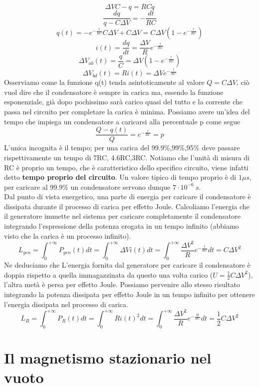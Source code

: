 \documentclass[
10pt, %
a4paper, %
oneside, %
headinclude,footinclude, %
BCOR5mm, %
]{scrartcl}
\begin{document}
\[\Delta V C-q = RC \dot{q}\]
\[\frac{dq}{q-C\Delta V}= -\frac{dt}{RC}\]
\[q(t) = -e^{-\frac{t}{RC}}C\Delta V+C\Delta V = C\Delta V(1-e^{-\frac{t}{RC}})\]
\[i(t) = \frac{dq}{dt} = \frac{\Delta V}{R}e^{-\frac{t}{RC}}\]
\[\Delta V_{ab}(t)=\frac{q}{C}= \Delta V(1-e^{-\frac{t}{RC}})\]
\[\Delta V_{bd}(t)=Ri(t)= \Delta Ve^{-\frac{t}{RC}}\]
Osserviamo come la funzione q(t) tenda asintoticamente al valore \(Q=C\Delta V \), ciò vuol dire che il condensatore è sempre in carica ma, essendo la funzione esponenziale, già dopo pochissimo sarà carico quasi del tutto e la corrente che passa nel circuito per completare la carica è minima. Possiamo avere un'idea del tempo che impiega un condensatore a caricarsi alla percentuale p come segue
\[\frac{Q-q(t)}{Q} = e^{-\frac{t}{RC}}=p\]
L'unica incognita è il tempo; per una carica del 99.9\%,99\%,95\% deve passare rispettivamente un tempo di 7RC, 4.6RC,3RC. Notiamo che l'unità di misura di RC è proprio un tempo, che è caratteristico dello specifico circuito, viene infatti detto \textbf{tempo proprio del circuito}. Un valore tipico di tempo proprio è di \(1\mu s \), per caricare al 99.9\% un condensatore servono dunque \(7\cdot10^{-6}\ s\). \\
Dal punto di vista energetico, una parte di energia per caricare il condensatore è dissipata durante il processo di carica per effetto Joule. Calcoliamo l'energia che il generatore immette nel sistema per caricare completamente il condensatore integrando l'espressione della potenza erogata in un tempo infinito (abbiamo visto che la carica è un processo infinito). 
\[L_{gen} = \int_{0}^{+\infty}P_{gen}(t)dt=\int_{0}^{+\infty}\Delta V i(t)dt = \int_{0}^{+\infty}\frac{\Delta V^2}{R} e^{-\frac{t}{RC}}dt = C\Delta V^2 \]
Ne deduciamo che L'energia fornita dal generatore per caricare il condensatore è doppia rispetto a quella immagazzinata da questo una volta carico (\(U=\frac{1}{2}C\Delta V^2\)), l'altra metà è persa per effetto Joule. Possiamo pervenire allo stesso risultato integrando la potenza dissipata per effetto Joule in un tempo infinito per ottenere l'energia dissipata nel processo di carica. 
\[L_{R} = \int_{0}^{+\infty}P_{R}(t)dt =\int_{0}^{+\infty}Ri(t)^2dt = \int_{0}^{+\infty}\frac{\Delta V^2}{R}e^{-\frac{2t}{RC}}dt = \frac{1}{2}C\Delta V^2\]
\newpage
\section{Il magnetismo stazionario nel vuoto}
\end{document}
